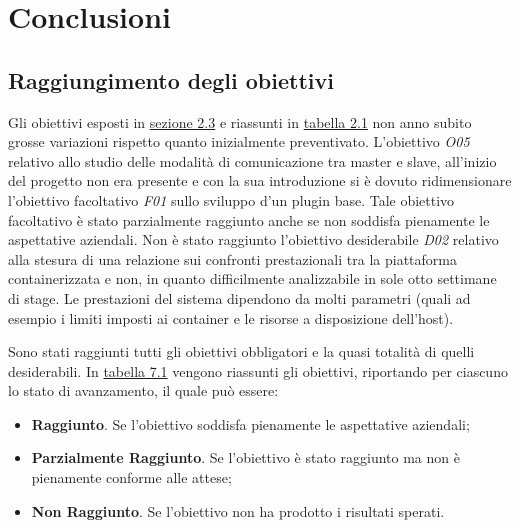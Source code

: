 
\pagestyle{IHA-fancy-style}
\chapter{Conclusioni}
\label{cap:conclusioni}


\section{Raggiungimento degli obiettivi}
\label{sec:obiettivi-raggiunti}

Gli obiettivi esposti in \hyperref[sec:ob]{sezione 2.3} e riassunti in \hyperref[tab:obiettivi-iniziali]{tabella 2.1} non anno subito grosse variazioni rispetto quanto inizialmente preventivato. L'obiettivo \textit{O05} relativo allo studio delle modalità di comunicazione tra \gls{master} e \gls{slave}, all'inizio del progetto non era presente e con la sua introduzione si è dovuto ridimensionare l'obiettivo facoltativo \textit{F01} sullo sviluppo d'un \gls{plugin} base. Tale obiettivo facoltativo è stato parzialmente raggiunto anche se non soddisfa pienamente le aspettative aziendali. Non è stato raggiunto l'obiettivo desiderabile \textit{D02} relativo alla stesura di una relazione sui confronti prestazionali tra la piattaforma containerizzata e non, in quanto difficilmente analizzabile in sole otto settimane di stage. Le prestazioni del sistema dipendono da molti parametri (quali ad esempio i limiti imposti ai \gls{container} e le risorse a disposizione dell'\gls{host}). 

Sono stati raggiunti tutti gli obiettivi obbligatori e la quasi totalità di quelli desiderabili. In \hyperref[tab:obiettivi-finali]{tabella 7.1} vengono riassunti gli obiettivi, riportando per ciascuno lo stato di avanzamento, il quale può essere:

\begin{itemize}
    \item \textbf{Raggiunto}. Se l'obiettivo soddisfa pienamente le aspettative aziendali;
    \item \textbf{Parzialmente Raggiunto}. Se l'obiettivo è stato raggiunto ma non è pienamente conforme alle attese;
    \item \textbf{Non Raggiunto}. Se l'obiettivo non ha prodotto i risultati sperati.
\end{itemize}

